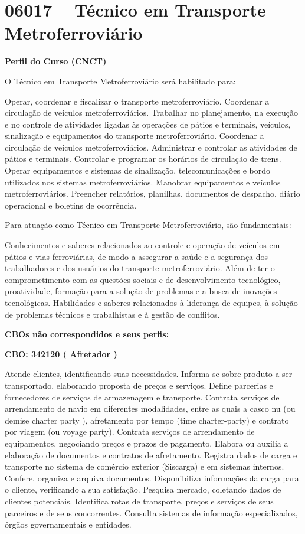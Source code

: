 \documentclass[
]{article}
\begin{document}
\newpage
\section{ 06017 -- Técnico em Transporte Metroferroviário }

\textbf{Perfil do Curso (CNCT)}

O Técnico em Transporte Metroferroviário será habilitado para:

Operar, coordenar e fiscalizar o transporte metroferroviário. Coordenar
a circulação de veículos metroferroviários. Trabalhar no planejamento,
na execução e no controle de atividades ligadas às operações de pátios e
terminais, veículos, sinalização e equipamentos do transporte
metroferroviário. Coordenar a circulação de veículos metroferroviários.
Administrar e controlar as atividades de pátios e terminais. Controlar e
programar os horários de circulação de trens. Operar equipamentos e
sistemas de sinalização, telecomunicações e bordo utilizados nos
sistemas metroferroviários. Manobrar equipamentos e veículos
metroferroviários. Preencher relatórios, planilhas, documentos de
despacho, diário operacional e boletins de ocorrência.

Para atuação como Técnico em Transporte Metroferroviário, são
fundamentais:

Conhecimentos e saberes relacionados ao controle e operação de veículos
em pátios e vias ferroviárias, de modo a assegurar a saúde e a segurança
dos trabalhadores e dos usuários do transporte metroferroviário. Além de
ter o comprometimento com as questões sociais e de desenvolvimento
tecnológico, proatividade, formação para a solução de problemas e a
busca de inovações tecnológicas. Habilidades e saberes relacionados à
liderança de equipes, à solução de problemas técnicos e trabalhistas e à
gestão de conflitos.

\textbf{CBOs não correspondidos e seus perfis:}

\textbf{CBO: 342120  ( Afretador )}

Atende clientes, identificando suas necessidades. Informa-se sobre
produto a ser transportado, elaborando proposta de preços e serviços.
Define parcerias e fornecedores de serviços de armazenagem e transporte.
Contrata serviços de arrendamento de navio em diferentes modalidades,
entre as quais a casco nu (ou demise charter party ), afretamento por
tempo (time charter-party) e contrato por viagem (ou voyage party).
Contrata serviços de arrendamento de equipamentos, negociando preços e
prazos de pagamento. Elabora ou auxilia a elaboração de documentos e
contratos de afretamento. Registra dados de carga e transporte no
sistema de comércio exterior (Siscarga) e em sistemas internos. Confere,
organiza e arquiva documentos. Disponibiliza informações da carga para o
cliente, verificando a sua satisfação. Pesquisa mercado, coletando dados
de clientes potenciais. Identifica rotas de transporte, preços e
serviços de seus parceiros e de seus concorrentes. Consulta sistemas de
informação especializados, órgãos governamentais e entidades.
\end{document}
